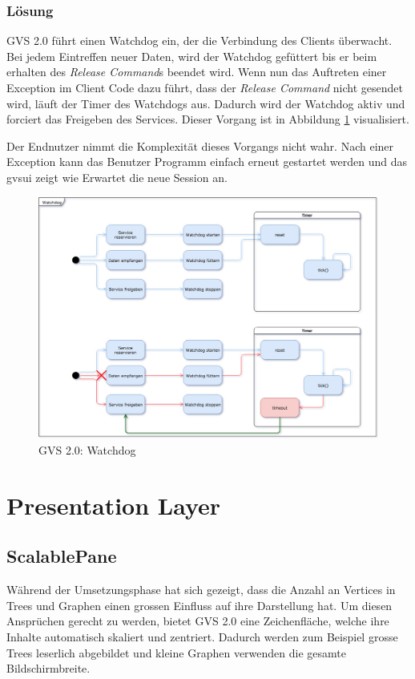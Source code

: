 \documentclass[11pt,a4paper,english,oneside]{book}
\numberwithin{equation}{chapter}
\begin{document}
	\subsubsection{Lösung}
	GVS 2.0 führt einen Watchdog ein, der die Verbindung des Clients überwacht. Bei jedem Eintreffen neuer Daten, wird der Watchdog gefüttert bis er beim erhalten des \textit{Release Command}s beendet wird. Wenn nun das Auftreten einer Exception im Client Code dazu führt, dass der \textit{Release Command} nicht gesendet wird, läuft der Timer des Watchdogs aus. Dadurch wird der Watchdog aktiv und forciert das Freigeben des Services. Dieser Vorgang ist in Abbildung \ref{fig:watchdog} visualisiert.
	
	Der Endnutzer nimmt die Komplexität dieses Vorgangs nicht wahr. Nach einer Exception kann das Benutzer Programm einfach erneut gestartet werden und das \gls{gvsui} zeigt wie Erwartet die neue Session an.
	
	\begin{figure}[h!]
		\centering
		\includegraphics[width=0.7\linewidth]{assets/images/watchdog}
		\caption{GVS  2.0: Watchdog}
		\label{fig:watchdog}
	\end{figure}
	
	
	\section{Presentation Layer}
	
	\subsection{ScalablePane}
	Während der Umsetzungsphase hat sich gezeigt, dass die Anzahl an Vertices in Trees und Graphen einen grossen Einfluss auf ihre Darstellung hat. Um diesen Ansprüchen gerecht zu werden, bietet GVS 2.0 eine Zeichenfläche, welche ihre Inhalte automatisch skaliert und zentriert. Dadurch werden zum Beispiel grosse Trees leserlich abgebildet und kleine Graphen verwenden die gesamte Bildschirmbreite. 
	
\end{document}
